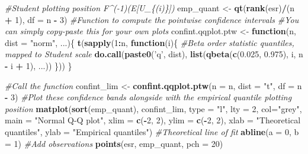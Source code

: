 \documentclass[]{book}
\newenvironment{Shaded}{\begin{snugshade}}{\end{snugshade}}
\newcommand{\CommentTok}[1]{\textcolor[rgb]{0.56,0.35,0.01}{\textit{#1}}}
\newcommand{\ControlFlowTok}[1]{\textcolor[rgb]{0.13,0.29,0.53}{\textbf{#1}}}
\newcommand{\DataTypeTok}[1]{\textcolor[rgb]{0.13,0.29,0.53}{#1}}
\newcommand{\DecValTok}[1]{\textcolor[rgb]{0.00,0.00,0.81}{#1}}
\newcommand{\FloatTok}[1]{\textcolor[rgb]{0.00,0.00,0.81}{#1}}
\newcommand{\KeywordTok}[1]{\textcolor[rgb]{0.13,0.29,0.53}{\textbf{#1}}}
\newcommand{\NormalTok}[1]{#1}
\newcommand{\OperatorTok}[1]{\textcolor[rgb]{0.81,0.36,0.00}{\textbf{#1}}}
\newcommand{\StringTok}[1]{\textcolor[rgb]{0.31,0.60,0.02}{#1}}
\theoremstyle{definition}
\theoremstyle{definition}
\theoremstyle{definition}
\theoremstyle{remark}
\begin{document}
\begin{Shaded}
\begin{Highlighting}[]
\CommentTok{#Student plotting position F^(-1)(E[U_\{(i)\}])}
\NormalTok{emp_quant <-}\StringTok{ }\KeywordTok{qt}\NormalTok{(}\KeywordTok{rank}\NormalTok{(esr)}\OperatorTok{/}\NormalTok{(n }\OperatorTok{+}\StringTok{ }\DecValTok{1}\NormalTok{),  }\DataTypeTok{df =}\NormalTok{ n }\OperatorTok{-}\StringTok{ }\DecValTok{3}\NormalTok{)  }
\CommentTok{#Function to compute the pointwise confidence intervals}
\CommentTok{#You can simply copy-paste this for your own plots}
\NormalTok{confint.qqplot.ptw <-}\StringTok{ }\ControlFlowTok{function}\NormalTok{(n, }\DataTypeTok{dist =} \StringTok{"norm"}\NormalTok{, ...)\{}
  \KeywordTok{t}\NormalTok{(}\KeywordTok{sapply}\NormalTok{(}\DecValTok{1}\OperatorTok{:}\NormalTok{n, }\ControlFlowTok{function}\NormalTok{(i)\{}
  \CommentTok{#Beta order statistic quantiles, mapped to Student scale}
    \KeywordTok{do.call}\NormalTok{(}\KeywordTok{paste0}\NormalTok{(}\StringTok{'q'}\NormalTok{, dist), }\KeywordTok{list}\NormalTok{(}\KeywordTok{qbeta}\NormalTok{(}\KeywordTok{c}\NormalTok{(}\FloatTok{0.025}\NormalTok{, }\FloatTok{0.975}\NormalTok{), i, n }\OperatorTok{-}\StringTok{ }\NormalTok{i }\OperatorTok{+}\StringTok{ }\DecValTok{1}\NormalTok{), ...))}
\NormalTok{  \}))}
\NormalTok{\}}

\CommentTok{#Call the function}
\NormalTok{confint_lim <-}\StringTok{ }\KeywordTok{confint.qqplot.ptw}\NormalTok{(}\DataTypeTok{n =}\NormalTok{ n, }\DataTypeTok{dist =} \StringTok{"t"}\NormalTok{, }\DataTypeTok{df =}\NormalTok{ n }\OperatorTok{-}\StringTok{ }\DecValTok{3}\NormalTok{)}
\CommentTok{#Plot these confidence bands alongside with the empirical quantile plotting position}
\KeywordTok{matplot}\NormalTok{(}\KeywordTok{sort}\NormalTok{(emp_quant), confint_lim, }\DataTypeTok{type =} \StringTok{"l"}\NormalTok{, }\DataTypeTok{lty =} \DecValTok{2}\NormalTok{, }\DataTypeTok{col=}\StringTok{"grey"}\NormalTok{,}
        \DataTypeTok{main =} \StringTok{"Normal Q-Q plot"}\NormalTok{, }\DataTypeTok{xlim =} \KeywordTok{c}\NormalTok{(}\OperatorTok{-}\DecValTok{2}\NormalTok{, }\DecValTok{2}\NormalTok{), }\DataTypeTok{ylim =} \KeywordTok{c}\NormalTok{(}\OperatorTok{-}\DecValTok{2}\NormalTok{, }\DecValTok{2}\NormalTok{),}
        \DataTypeTok{xlab =} \StringTok{"Theoretical quantiles"}\NormalTok{, }\DataTypeTok{ylab =} \StringTok{"Empirical quantiles"}\NormalTok{)  }
\CommentTok{#Theoretical line of fit}
\KeywordTok{abline}\NormalTok{(}\DataTypeTok{a =} \DecValTok{0}\NormalTok{, }\DataTypeTok{b =} \DecValTok{1}\NormalTok{)}
\CommentTok{#Add observations}
\KeywordTok{points}\NormalTok{(esr, emp_quant, }\DataTypeTok{pch =} \DecValTok{20}\NormalTok{)}
\end{Highlighting}
\end{Shaded}
\end{document}
